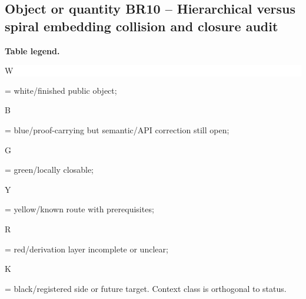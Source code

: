 \subsection*{Object or quantity BR10 -- Hierarchical versus spiral embedding collision and closure audit}
\hypertarget{objproof:BR10}{}
\par\smallskip\noindent\begin{minipage}{0.99\linewidth}\footnotesize\raggedright\textbf{Table legend.} \colorbox{white}{\strut W} = white/finished public object; \colorbox{cyan!20}{\strut B} = blue/proof-carrying but semantic/API correction still open; \colorbox{green!18}{\strut G} = green/locally closable; \colorbox{yellow!25}{\strut Y} = yellow/known route with prerequisites; \colorbox{red!20}{\strut R} = red/derivation layer incomplete or unclear; \colorbox{black!18}{\strut K} = black/registered side or future target. Context class is orthogonal to status.\end{minipage}\par\vspace{0.25em}
